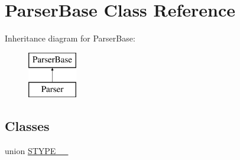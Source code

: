 \hypertarget{classParserBase}{\section{Parser\+Base Class Reference}
\label{classParserBase}
}
Inheritance diagram for Parser\+Base\+:\begin{figure}[H]
\begin{center}
\leavevmode
\includegraphics[height=2.000000cm]{classParserBase}
\end{center}
\end{figure}
\subsection*{Classes}
\begin{DoxyCompactItemize}
\item 
union \hyperlink{unionParserBase_1_1STYPE____}{S\+T\+Y\+P\+E\+\_\+\+\_\+}
\end{DoxyCompactItemize}
